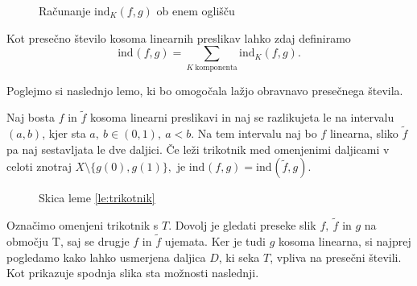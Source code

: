 \documentclass[mat1]{fmfdelo}
\newcommand{\ind}[3][]{\text{ind}_{#1}(#2, #3)}
\begin{document}
\begin{figure}[h!]
\centering
{}
\caption{Računanje $\ind[K]{f}{g}$ ob enem oglišču}
\label{fig:presecno_daljica_3}
\end{figure}

Kot presečno število kosoma linearnih preslikav lahko zdaj definiramo 
\[
\ind{f}{g} = \sum_{K\ \text{komponenta}} \ind[K]{f}{g}.
\]

Poglejmo si naslednjo lemo, ki bo omogočala lažjo obravnavo presečnega števila.
\begin{lema}\label{le:trikotnik}
Naj bosta $f$ in $\widetilde{f}$ kosoma linearni preslikavi in naj se razlikujeta le na intervalu $(a, b)$, kjer sta $a,\ b \in (0, 1),\ a<b$. Na tem intervalu naj bo $f$ linearna, sliko $\widetilde{f}$ pa naj sestavljata le dve daljici. Če leži trikotnik med omenjenimi daljicami v celoti znotraj $X \setminus \{g(0), g(1)\},$ je $\ind{f}{g} = \ind{\widetilde{f}}{g}$. 
\end{lema}

\begin{figure}[h!]
\centering
{}
\caption{Skica leme \ref{le:trikotnik}}
\end{figure}

\proof
Označimo omenjeni trikotnik s $T$. Dovolj je gledati preseke slik $f,\ \widetilde{f}$ in $g$ na območju T, saj se drugje $f$ in $\widetilde{f}$ ujemata. Ker je tudi $g$ kosoma linearna, si najprej pogledamo kako lahko usmerjena daljica $D$, ki seka $T$, vpliva na presečni števili. Kot prikazuje spodnja slika sta možnosti naslednji.
\end{document}
